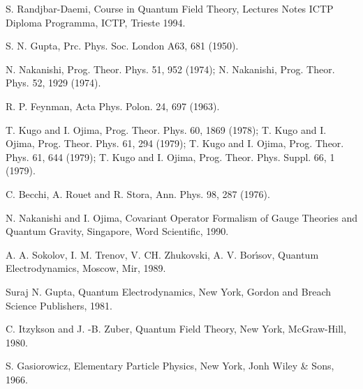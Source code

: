 \documentclass[12pt,letterpaper]{report}
\begin{document}
\begin{thebibliography}{99}
 S. Randjbar-Daemi, Course in Quantum Field Theory, Lectures
Notes ICTP Diploma Programma, ICTP, Trieste 1994.

 S. N. Gupta, Prc. Phys. Soc. London A63, 681 (1950).

 N. Nakanishi, Prog. Theor. Phys. 51,
952 (1974); N. Nakanishi, Prog. Theor. Phys. 52, 1929 (1974).

 R. P. Feynman, Acta Phys. Polon. 24, 697 (1963).

 T. Kugo and I. Ojima, Prog. Theor. Phys. 60,
1869 (1978); T. Kugo and I. Ojima, Prog. Theor. Phys. 61, 294
(1979); T. Kugo and I. Ojima, Prog. Theor. Phys. 61, 644 (1979);
T. Kugo and I. Ojima, Prog. Theor. Phys. Suppl. 66, 1 (1979).

 C. Becchi, A. Rouet and R. Stora, Ann. Phys. 98, 287 (1976).

 N. Nakanishi and I. Ojima, Covariant Operator Formalism
of Gauge Theories and Quantum Gravity, Singapore, Word Scientific,
1990.

 A. A. Sokolov, I. M. Trenov, V. CH. Zhukovski, A. V.
Bor\'{\i}sov, Quantum Electrodynamics, Moscow, Mir, 1989.

 Suraj N. Gupta, Quantum Electrodynamics, New York,
Gordon and Breach Science Publishers, 1981.

 C. Itzykson and J. -B. Zuber, Quantum Field Theory, New
York, McGraw-Hill, 1980.

 S. Gasiorowicz, Elementary Particle Physics, New
York, Jonh Wiley \& Sons, 1966.

\end{thebibliography}
\end{document}
